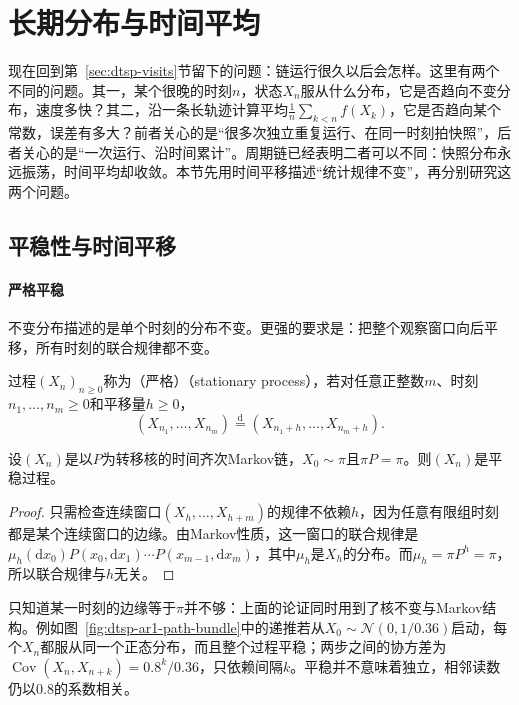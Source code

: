 \section{长期分布与时间平均}
\label{sec:dtsp-long-run}

现在回到第~\ref{sec:dtsp-visits}节留下的问题：链运行很久以后会怎样。这里有两个不同的问题。其一，某个很晚的时刻$n$，状态$X_n$服从什么分布，它是否趋向不变分布，速度多快？其二，沿一条长轨迹计算平均$\frac1n\sum_{k<n}f(X_k)$，它是否趋向某个常数，误差有多大？前者关心的是“很多次独立重复运行、在同一时刻拍快照”，后者关心的是“一次运行、沿时间累计”。周期链已经表明二者可以不同：快照分布永远振荡，时间平均却收敛。本节先用时间平移描述“统计规律不变”，再分别研究这两个问题。

\subsection{平稳性与时间平移}
\label{sec:dtsp-stationarity}

\paragraph{严格平稳}
不变分布描述的是单个时刻的分布不变。更强的要求是：把整个观察窗口向后平移，所有时刻的联合规律都不变。

\begin{definition}[平稳过程]
  \label{def:dtsp-stationary-process}
  过程$(X_n)_{n\geq0}$称为（严格）（stationary process），若对任意正整数$m$、时刻$n_1,\ldots,n_m\geq0$和平移量$h\geq0$，
  \[
    (X_{n_1},\ldots,X_{n_m})\overset{\mathrm d}{=}(X_{n_1+h},\ldots,X_{n_m+h}).
  \]
\end{definition}

\begin{theorem}[从不变分布启动的链是平稳的]
  \label{thm:dtsp-stationary-chain}
  设$(X_n)$是以$P$为转移核的时间齐次Markov链，$X_0\sim\pi$且$\pi P=\pi$。则$(X_n)$是平稳过程。
\end{theorem}

\begin{proof}
只需检查连续窗口$(X_h,\ldots,X_{h+m})$的规律不依赖$h$，因为任意有限组时刻都是某个连续窗口的边缘。由Markov性质，这一窗口的联合规律是$\mu_h(\mathrm dx_0)P(x_0,\mathrm dx_1)\cdots P(x_{m-1},\mathrm dx_m)$，其中$\mu_h$是$X_h$的分布。而$\mu_h=\pi P^h=\pi$，所以联合规律与$h$无关。
\end{proof}

只知道某一时刻的边缘等于$\pi$并不够：上面的论证同时用到了核不变与Markov结构。例如图~\ref{fig:dtsp-ar1-path-bundle}中的递推若从$X_0\sim\mathcal N(0,1/0.36)$启动，每个$X_n$都服从同一个正态分布，而且整个过程平稳；两步之间的协方差为$\operatorname{Cov}(X_n,X_{n+k})=0.8^k/0.36$，只依赖间隔$k$。平稳并不意味着独立，相邻读数仍以$0.8$的系数相关。

